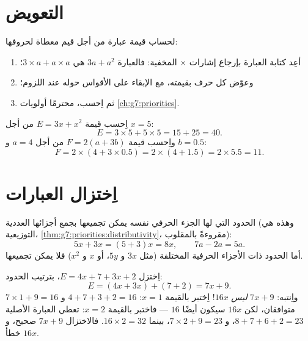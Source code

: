 \section{التعويض}

\begin{method}\label{met:g7:literal:substitute}
لحساب قيمة عبارة من أجل قيم معطاة لحروفها:
\begin{enumerate}
  \item أعِد كتابة العبارة بإرجاع إشارات $\times$ المخفية:
        فالعبارة $3a + a^2$ هي $3 \times a + a \times a$؛
  \item وعوّض كل حرف بقيمته، مع الإبقاء على الأقواس حوله
        عند اللزوم؛
  \item ثم اِحسب، محترمًا أولويات
        \cref{ch:g7:priorities}.
\end{enumerate}
\end{method}

\begin{example}\label{ex:g7:literal:substitute}
اِحسب قيمة $E = 3x + x^2$ من أجل $x = 5$:
\[
E = 3 \times 5 + 5 \times 5 = 15 + 25 = 40 .
\]
واِحسب قيمة $F = 2(a + 3b)$ من أجل $a = 4$ و $b = 0.5$:
\[
F = 2 \times (4 + 3 \times 0.5) = 2 \times (4 + 1.5) = 2 \times 5.5
= 11 .
\]
\end{example}

\section{اِختزال العبارات}

\begin{proposition}\label{prop:g7:literal:reduce}
الحدود التي لها الجزء الحرفي نفسه يمكن تجميعها بجمع
أجزائها العددية (وهذه هي التوزيعية،
\cref{thm:g7:priorities:distributivity}، مقروءةً بالمقلوب):
\[
5x + 3x = (5 + 3)x = 8x,
\qquad
7a - 2a = 5a .
\]
أما الحدود ذات الأجزاء الحرفية المختلفة (مثل $3x$ و $5y$، أو $x$ و
$x^2$) فلا يمكن تجميعها.
\end{proposition}

\begin{example}\label{ex:g7:literal:reduce}
اِختزل $E = 4x + 7 + 3x + 2$، بترتيب الحدود:
\[
E = (4x + 3x) + (7 + 2) = 7x + 9 .
\]
واِنتبه: $7x + 9$ \emph{ليس} $16x$! اِختبر بالقيمة $x = 1$:
$4 + 7 + 3 + 2 = 16$ و $7 \times 1 + 9 = 16$ متوافقان، لكن $16x$ سيكون
أيضًا $16$ --- فاختبر بالقيمة $x = 2$: تعطي العبارة الأصلية
$8 + 7 + 6 + 2 = 23$، و $7 \times 2 + 9 = 23$، بينما
$16 \times 2 = 32$. فالاختزال $7x + 9$ صحيح، و $16x$ خطأ.
\end{example}

